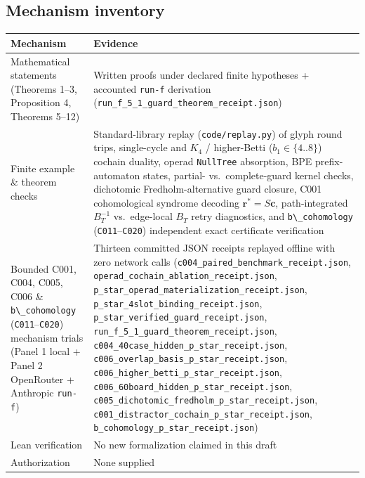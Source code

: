 \documentclass[
  11pt,
]{article}
\newcommand{\passthrough}[1]{#1}
\begin{document}
\subsection{Mechanism inventory}\label{mechanism-inventory}

\begin{longtable}[]{@{}
  >{\raggedright\arraybackslash}p{}
  >{\raggedright\arraybackslash}p{}@{}}
\toprule\noalign{}
\begin{minipage}[b]{\linewidth}\raggedright
Mechanism
\end{minipage} & \begin{minipage}[b]{\linewidth}\raggedright
Evidence
\end{minipage} \\
\midrule\noalign{}
\endhead
\bottomrule\noalign{}
\endlastfoot
Mathematical statements (Theorems 1--3, Proposition 4, Theorems 5--12) &
Written proofs under declared finite hypotheses + accounted
\nolinkurl{run-f} derivation
(\nolinkurl{run_f_5_1_guard_theorem_receipt.json}) \\
Finite example \& theorem checks & Standard-library replay
(\nolinkurl{code/replay.py}) of glyph round trips, single-cycle and
\(K_4\) / higher-Betti (\(b_1 \in \{4..8\}\)) cochain duality, operad
\passthrough{\lstinline!NullTree!} absorption, BPE prefix-automaton
states, partial- vs.~complete-guard kernel checks, dichotomic
Fredholm-alternative guard closure, C001 cohomological syndrome decoding
\(\mathbf{r}^* = S\mathbf{c}\), path-integrated \(B_T^{-1}\)
vs.~edge-local \(B_T\) retry diagnostics, and
\passthrough{\lstinline!b\_cohomology!}
(\passthrough{\lstinline!C011!}--\passthrough{\lstinline!C020!})
independent exact certificate verification \\
Bounded C001, C004, C005, C006 \&
\passthrough{\lstinline!b\_cohomology!}
(\passthrough{\lstinline!C011!}--\passthrough{\lstinline!C020!})
mechanism trials (Panel 1 local + Panel 2 OpenRouter + Anthropic
\nolinkurl{run-f}) & Thirteen committed JSON receipts
replayed offline with zero network calls
(\nolinkurl{c004_paired_benchmark_receipt.json},
\nolinkurl{operad_cochain_ablation_receipt.json},
\nolinkurl{p_star_operad_materialization_receipt.json},
\nolinkurl{p_star_4slot_binding_receipt.json},
\nolinkurl{p_star_verified_guard_receipt.json},
\nolinkurl{run_f_5_1_guard_theorem_receipt.json},
\nolinkurl{c004_40case_hidden_p_star_receipt.json},
\nolinkurl{c006_overlap_basis_p_star_receipt.json},
\nolinkurl{c006_higher_betti_p_star_receipt.json},
\nolinkurl{c006_60board_hidden_p_star_receipt.json},
\nolinkurl{c005_dichotomic_fredholm_p_star_receipt.json},
\nolinkurl{c001_distractor_cochain_p_star_receipt.json},
\nolinkurl{b_cohomology_p_star_receipt.json}) \\
Lean verification & No new formalization claimed in this draft \\
Authorization & None supplied \\
\end{longtable}
\end{document}
